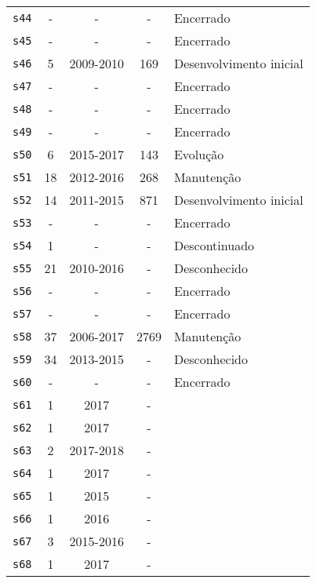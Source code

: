 \begin{longtable}{ l c c c l }
    \texttt{s44} & - & - & - & Encerrado \\
    \texttt{s45} & - & - & - & Encerrado \\
    \texttt{s46} & 5 & 2009-2010 & 169 & Desenvolvimento inicial \\
    \texttt{s47} & - & - & - & Encerrado \\
    \texttt{s48} & - & - & - & Encerrado \\
    \texttt{s49} & - & - & - & Encerrado \\
    \texttt{s50} & 6 & 2015-2017 & 143 & Evolução \\
    \texttt{s51} & 18 & 2012-2016 & 268 & Manutenção \\
    \texttt{s52} & 14 & 2011-2015 & 871 & Desenvolvimento inicial \\
    \texttt{s53} & - & - & - & Encerrado \\
    \texttt{s54} & 1 & - & - & Descontinuado \\
    \texttt{s55} & 21 & 2010-2016 & - & Desconhecido \\
    \texttt{s56} & - & - & - & Encerrado \\
    \texttt{s57} & - & - & - & Encerrado \\
    \texttt{s58} & 37 & 2006-2017 & 2769 & Manutenção \\
    \texttt{s59} & 34 & 2013-2015 & - & Desconhecido \\
    \texttt{s60} & - & - & - & Encerrado \\
    \texttt{s61} & 1 & 2017 & - &  \\
    \texttt{s62} & 1 & 2017 & - &  \\
    \texttt{s63} & 2 & 2017-2018 & - &  \\
    \texttt{s64} & 1 & 2017 & - &  \\
    \texttt{s65} & 1 & 2015 & - &  \\
    \texttt{s66} & 1 & 2016 & - &  \\
    \texttt{s67} & 3 & 2015-2016 & - &  \\
    \texttt{s68} & 1 & 2017 & - &  \\
\end{longtable}
